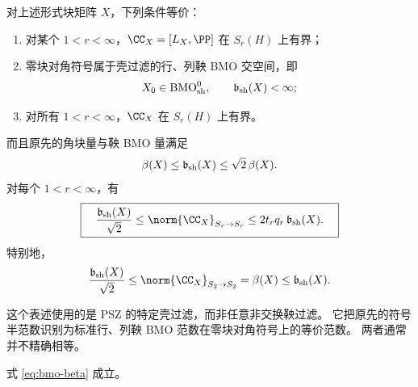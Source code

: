 \begin{theorem}\label{thm:sharp}
对上述形式块矩阵 $X$，下列条件等价：
\begin{enumerate}[label=\textup{(\roman*)}]
 \item 对某个 $1<r<\infty$，$\CC_X=[L_X,\PP]$ 在 $S_r(H)$ 上有界；
 \item 零块对角符号属于壳过滤的行、列鞅 BMO 交空间，即
 \[
 X_0\in\mathrm{BMO}_{\rm sh}^{0},\qquad
 \mathfrak b_{\rm sh}(X)<\infty;
 \]
 \item 对所有 $1<r<\infty$，$\CC_X$ 在 $S_r(H)$ 上有界。
\end{enumerate}
而且原先的角块量与鞅 BMO 量满足
\begin{equation}\label{eq:bmo-beta}
 \beta(X)\leq\mathfrak b_{\rm sh}(X)\leq\sqrt2\,\beta(X).
\end{equation}
对每个 $1<r<\infty$，有
\begin{equation}\label{eq:sharpbounds}
 \boxed{\quad
 \frac{\mathfrak b_{\rm sh}(X)}{\sqrt2}
 \leq\norm{\CC_X}_{S_r\to S_r}
 \leq2t_rq_r\,\mathfrak b_{\rm sh}(X).
 \quad}
\end{equation}
特别地，
\begin{equation}\label{eq:exact2}
 \frac{\mathfrak b_{\rm sh}(X)}{\sqrt2}
 \leq\norm{\CC_X}_{S_2\to S_2}
 =\beta(X)\leq\mathfrak b_{\rm sh}(X).
\end{equation}
\end{theorem}

这个表述使用的是 PSZ 的特定壳过滤，而非任意非交换鞅过滤。
它把原先的符号半范数识别为标准行、列鞅 BMO 范数在零块对角符号上的等价范数。
两者通常并不精确相等。

\begin{lemma}\label{lem:bmo-beta}
式 \eqref{eq:bmo-beta} 成立。
\end{lemma}

